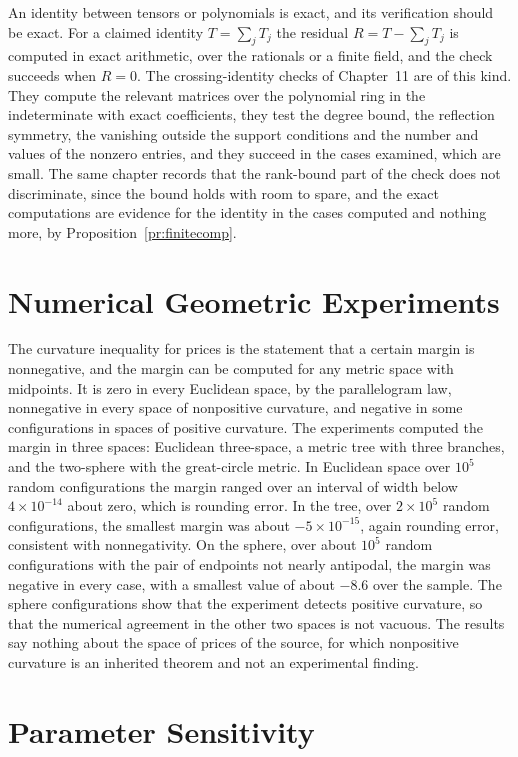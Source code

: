 \documentclass[11pt,letterpaper]{report}
\theoremstyle{plain}
\theoremstyle{definition}
\theoremstyle{remark}
\begin{document}
An identity between tensors or polynomials is exact, and its verification should be exact. For a claimed identity $T=\sum_jT_j$ the residual $R=T-\sum_jT_j$ is computed in exact arithmetic, over the rationals or a finite field, and the check succeeds when $R=0$. The crossing-identity checks of Chapter~11 are of this kind. They compute the relevant matrices over the polynomial ring in the indeterminate with exact coefficients, they test the degree bound, the reflection symmetry, the vanishing outside the support conditions and the number and values of the nonzero entries, and they succeed in the cases examined, which are small. The same chapter records that the rank-bound part of the check does not discriminate, since the bound holds with room to spare, and the exact computations are evidence for the identity in the cases computed and nothing more, by Proposition~\ref{pr:finitecomp}.

\section{Numerical Geometric Experiments}

The curvature inequality for prices is the statement that a certain margin is nonnegative, and the margin can be computed for any metric space with midpoints. It is zero in every Euclidean space, by the parallelogram law, nonnegative in every space of nonpositive curvature, and negative in some configurations in spaces of positive curvature. The experiments computed the margin in three spaces: Euclidean three-space, a metric tree with three branches, and the two-sphere with the great-circle metric. In Euclidean space over $10^5$ random configurations the margin ranged over an interval of width below $4\times10^{-14}$ about zero, which is rounding error. In the tree, over $2\times10^5$ random configurations, the smallest margin was about $-5\times10^{-15}$, again rounding error, consistent with nonnegativity. On the sphere, over about $10^5$ random configurations with the pair of endpoints not nearly antipodal, the margin was negative in every case, with a smallest value of about $-8.6$ over the sample. The sphere configurations show that the experiment detects positive curvature, so that the numerical agreement in the other two spaces is not vacuous. The results say nothing about the space of prices of the source, for which nonpositive curvature is an inherited theorem and not an experimental finding.

\section{Parameter Sensitivity}
\end{document}
